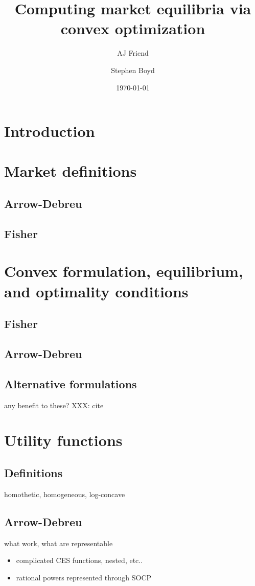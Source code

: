 \documentclass{article}
\title{Computing market equilibria via convex optimization}
\author{AJ Friend \and Stephen Boyd}
\date{\today}
\begin{document}
\maketitle

\section{Introduction}

\section{Market definitions}
\subsection{Arrow-Debreu}

\subsection{Fisher}

\section{Convex formulation, equilibrium, and optimality conditions}
\subsection{Fisher}
\subsection{Arrow-Debreu}
\subsection{Alternative formulations}
any benefit to these? XXX: cite

\section{Utility functions}
\subsection{Definitions}
homothetic, homogeneous, log-concave


\subsection{Arrow-Debreu}
what work, what are representable
\begin{itemize}
\item complicated CES functions, nested, etc..
\item rational powers represented through SOCP
\end{itemize}
\end{document}
